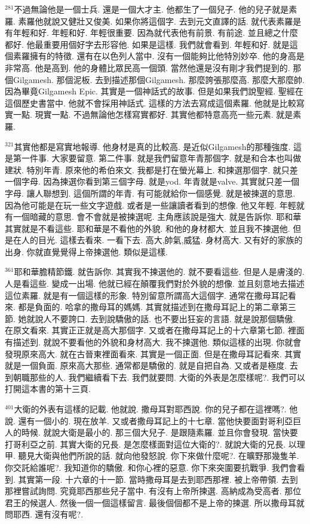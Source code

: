 \documentclass{book}
\begin{document}
$^{281}$不過無論他是一個士兵.
還是一個大才主.
他都生了一個兒子.
他的兒子就是素羅.
素羅他就說又健壯又俊美.
如果你將這個字.
去到元文直譯的話.
就代表素羅是有年輕和好.
年輕和好.
年輕很重要.
因為就代表他有前景.
有前途.
並且總之什麼都好.
他最重要用個好字去形容他.
如果是這樣.
我們就會看到.
年輕和好.
就是這個素羅擁有的特徵.
還有在以色列人當中.
沒有一個能夠比他特別妙卒.
他的身高是非常高.
他是高到.
他的身體比眾民高一個頭.
當然他還是沒有剛才我們提到的.
那個Gilgamesh.
那個泥板.
去到描述那個Gilgamesh.
那麼誇張那麼高.
那麼大那麼帥.
因為畢竟Gilgamesh Epic.
其實是一個神話式的故事.
但是如果我們說聖經.
聖經在這個歷史書當中.
他就不會採用神話式.
這樣的方法去寫成這個素羅.
他就是比較寫實一點.
現實一點.
不過無論他怎樣寫實都好.
其實他都特意高亮一些元素.
就是素羅.

$^{321}$其實他都是寫實地報導.
他身材是真的比較高.
是近似Gilgamesh的那種強度.
這是第一件事.
大家要留意.
第二件事.
就是我們留意年青那個字.
就是和合本也叫做建狀.
特別年青.
原來他的希伯來文.
我都是打在螢光幕上.
和揀選那個字.
就只差一個字母.
因為揀選你看到第三個字母.
就是yod.
年青就是valve.
其實就只差一個字母.
讓人聯想到.
這個所謂的年青.
有可能就給你一個感覺.
就是被揀選的意思.
因為他可能是在玩一些文字遊戲.
或者是一些讓讀者看到的想像.
他又年輕.
年輕就有一個暗藏的意思.
會不會就是被揀選呢.
主角應該說是強大.
就是告訴你.
耶和華其實就是不看這些.
耶和華是不看他的外貌.
和他的身材都大.
並且我不揀選他.
但是在人的目光.
這樣去看來.
一看下去.
高大,帥氣,威猛.
身材高大.
又有好的家族的出身.
你就直覺覺得上帝揀選他.
類似是這樣.

$^{361}$耶和華膽精節鐵.
就告訴你.
其實我不揀選他的.
就不要看這些.
但是人是膚淺的.
人是看這些.
變成一出場.
他就已經在顛覆我們對於外貌的想像.
並且刻意地去描述這位素羅.
就是有一個這樣的形象.
特別留意所謂高大這個字.
通常在撒母耳記看來.
都是負面的.
哈拿的撒母耳的媽媽.
其實就描述到在撒母耳記上的第二章第三節.
她就說人不要誇口.
去到說驕傲的話.
也不要出狂妄的言語.
就是說那個驕傲.
在原文看來.
其實正正就是高大那個字.
又或者在撒母耳記上的十六章第七節.
裡面有描述到.
就說不要看他的外貌和身材高大.
我不揀選他.
類似這樣的出現.
你就會發現原來高大.
就在古晉東裡面看來.
其實是一個正面.
但是在撒母耳記看來.
其實就是一個負面.
原來高大那些.
通常都是驕傲的.
就是自把自為.
又或者是極度.
去到朝職那些的人.
我們繼續看下去.
我們就要問.
大衛的外表是怎麼樣呢?.
我們可以打開這本書的第十三頁.

$^{401}$大衛的外表有這樣的記載.
他就說.
撒母耳對耶西說.
你的兒子都在這裡嗎?.
他說.
還有一個小的.
現在放羊.
又或者撒母耳記上的十七章.
當他快要面對哥利亞巨人的時候.
就說大衛是最小的.
那三個大兒子.
是跟隨素羅.
並且你會發現.
當快要打哥利亞之前.
其實大衛的兄長.
是怎麼樣面對這位大衛的?.
就說大衛的兄長.
以理甲.
聽見大衛與他們所說的話.
就向他發怒說.
你下來做什麼呢?.
在曠野那幾隻羊.
你交託給誰呢?.
我知道你的驕傲.
和你心裡的惡意.
你下來突圍要抗戰爭.
我們會看到.
其實第一段.
十六章的十一節.
當時撒母耳是去到耶西那裡.
被上帝帶領.
去到那裡嘗試詢問.
究竟耶西那些兒子當中.
有沒有上帝所揀選.
高納成為受高者.
那位君王的候選人.
然後一個一個這樣留言.
最後個個都不是上帝的揀選.
所以撒母耳就問耶西.
還有沒有呢?.
\end{document}
